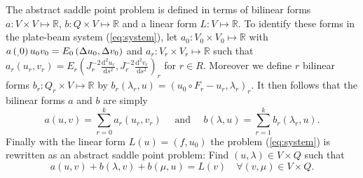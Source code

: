 \documentclass{marine_2015}
\newcommand{\inner}[2]{\ensuremath{\left(#1, #2\right)}}
\newcommand{\rinner}[2]{\ensuremath{\left(#1, #2\right)_r}}
\newcommand{\ainner}[2]{\ensuremath{a\left(#1, #2\right)}}
\newcommand{\arinner}[2]{\ensuremath{a_r\left(#1, #2\right)}}
\newcommand{\binner}[2]{\ensuremath{b\left(#1, #2\right)}}
\newcommand{\brinner}[2]{\ensuremath{b_r\left(#1, #2\right)}}
\newcommand{\Linner}[1]{\ensuremath{L\left(#1\right)}}
\newcommand{\tderiv}[2]{\ensuremath{\tfrac{\mathrm{d}#1}{\mathrm{d}#2}}}
\begin{document}
The abstract saddle point problem is defined in terms of bilinear forms $a:V\times V\mapsto \mathbb{R}$,
$b:Q\times V\mapsto \mathbb{R}$ and a linear form $L:V\mapsto\mathbb{R}$. To identify these 
forms in the plate-beam system (\ref{eq:system}), let $a_0:V_0\times V_0\mapsto
\mathbb{R}$ with $\ainner_0{u_0}{v_0}=E_0\inner{\Delta u_0}{\Delta v_0}$ and
$a_r:V_r\times V_r\mapsto \mathbb{R}$ such that $\arinner{u_r}{v_r}=E_r\rinner{J_r^{-2}\tderiv{^2 u_r}{s^2}}{J_r^{-2}\tderiv{^2
v_r}{s^2}}$ for $r\in R$. Moreover we define $r$ bilinear forms
$b_r:Q_r\times V\mapsto\mathbb{R}$ by
$\brinner{\lambda_r}{u}=\rinner{u_0\circ F_r-u_r}{\lambda_r}$. It then follows 
that the bilinear forms $a$ and $b$ are simply
\[
  \ainner{u}{v} = \displaystyle\sum_{r=0}^{k}\arinner{u_r}{v_r}\quad\text{ and
  }\quad\binner{\lambda}{u} = \displaystyle\sum_{r=1}^{k}\brinner{\lambda_r}{u}.
\]
Finally with the linear form $\Linner{u}=\inner{f}{u_0}$ the problem
(\ref{eq:system}) is rewritten as an abstract saddle point problem: Find
$\left(u, \lambda\right)\in V\times Q$ such that
\begin{equation}
  \label{eq:abstract_saddle}
  \ainner{u}{v} + \binner{\lambda}{v} + \binner{\mu}{u} = \Linner{v}\quad\forall
  \left(v, \mu\right)\in V\times Q.
\end{equation}
\end{document}
